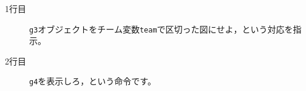 \begin{description}
	\item[1行目] \texttt{g3}オブジェクトをチーム変数\verb|team|で区切った図にせよ，という対応を指示。
	\item[2行目] \texttt{g4}を表示しろ，という命令です。
\end{description}
